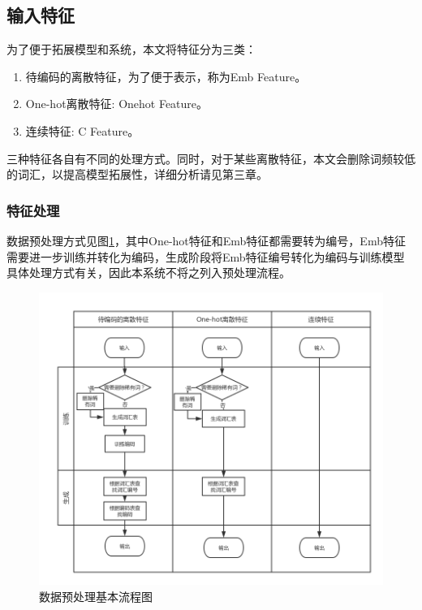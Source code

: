 \subsection{输入特征}
为了便于拓展模型和系统，本文将特征分为三类：\par
\begin{enumerate}
\item 待编码的离散特征，为了便于表示，称为Emb Feature。
\item One-hot离散特征: Onehot Feature。
\item 连续特征: C Feature。
\end{enumerate}
\par
三种特征各自有不同的处理方式。同时，对于某些离散特征，本文会删除词频较低的词汇，以提高模型拓展性，详细分析请见第三章。
\subsubsection{特征处理}
数据预处理方式见图\ref{featureprocessing}，其中One-hot特征和Emb特征都需要转为编号，Emb特征需要进一步训练并转化为编码，生成阶段将Emb特征编号转化为编码与训练模型具体处理方式有关，因此本系统不将之列入预处理流程。
\begin{figure}[!hbp]
\begin{center}
\includegraphics[width=\textwidth]{graphic/featurepocessing.png}
\caption{数据预处理基本流程图 \label{featureprocessing}}
\end{center}
\end{figure}
